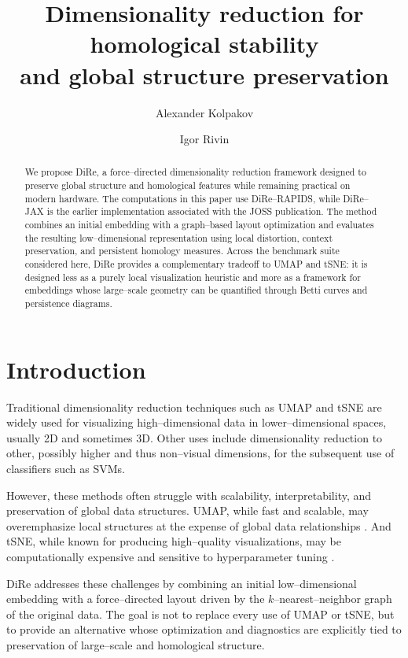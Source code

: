 \documentclass[11pt]{article}
\title{Dimensionality reduction for homological stability \\ and global structure preservation}
\author[1]{Alexander Kolpakov}
\author[2]{Igor Rivin}  %
\affil[1]{University of Austin, Austin TX, USA;
\texttt{akolpakov@uaustin.org}}
\affil[2]{Temple University, Philadelphia PA, USA;  
\texttt{rivin@temple.edu}}
\date{}  %
\begin{document}
\maketitle

\begin{abstract}
We propose DiRe, a force--directed dimensionality reduction framework designed to preserve global structure and homological features while remaining practical on modern hardware. The computations in this paper use DiRe--RAPIDS, while DiRe--JAX is the earlier implementation associated with the JOSS publication. The method combines an initial embedding with a graph--based layout optimization and evaluates the resulting low--dimensional representation using local distortion, context preservation, and persistent homology measures. Across the benchmark suite considered here, DiRe provides a complementary tradeoff to UMAP and tSNE: it is designed less as a purely local visualization heuristic and more as a framework for embeddings whose large--scale geometry can be quantified through Betti curves and persistence diagrams.
\end{abstract}

\section{Introduction}
Traditional dimensionality reduction techniques such as UMAP and tSNE \cite{umap,vandermaaten-tsne} are widely used for visualizing high--dimensional data in lower--dimensional spaces, usually 2D and sometimes 3D. Other uses include dimensionality reduction to other, possibly higher and thus non--visual dimensions, for the subsequent use of classifiers such as SVMs.

However, these methods often struggle with scalability, interpretability, and preservation of global data structures. UMAP, while fast and scalable, may overemphasize local structures at the expense of global data relationships \cite{pachter}. And tSNE, while known for producing high--quality visualizations, may be computationally expensive and sensitive to hyperparameter tuning \cite{kobak2019art}.

DiRe addresses these challenges by combining an initial low--dimensional embedding with a force--directed layout driven by the $k$--nearest--neighbor graph of the original data. The goal is not to replace every use of UMAP or tSNE, but to provide an alternative whose optimization and diagnostics are explicitly tied to preservation of large--scale and homological structure.
\end{document}
